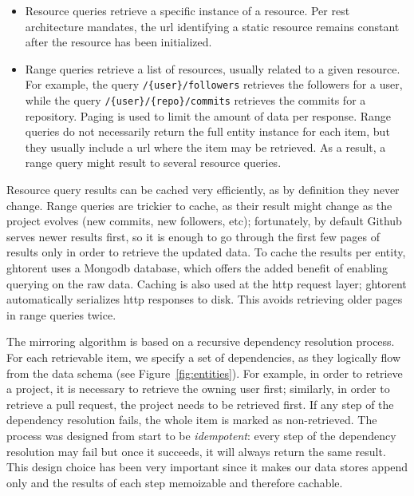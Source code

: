 \documentclass[conference,letter]{IEEEtran}
\begin{document}
\begin{itemize}

  \item Resource queries retrieve a specific instance of a resource. Per 
    {\sc rest} architecture mandates, the {\sc url} identifying a static
    resource remains constant after the resource has been initialized. 

  \item Range queries retrieve a list of resources, usually related to a given
    resource. For example, the query \texttt{/\{user\}/followers} retrieves the
    followers for a user, while the query \texttt{/\{user\}/\{repo\}/commits}
    retrieves the commits for a repository. Paging is used to limit the amount
    of data per response. Range queries do not necessarily return the full
    entity instance for each item, but they usually include a {\sc url} where
    the item may be retrieved. As a result, a range query might result to
    several resource queries.

\end{itemize}

Resource query results can be cached very efficiently, as by definition they
never change. Range queries are trickier to cache, as their result might change
as the project evolves (new commits, new followers, etc); fortunately, by
default Github serves newer results first, so it is enough to go through the
first few pages of results only in order to retrieve the updated data. To cache
the results per entity, {\sc ght}orent uses a Mongo{\sc db} database, which
offers the added benefit of enabling querying on the raw data. Caching is also
used at the {\sc http} request layer; {\sc ght}orent automatically serializes
{\sc http} responses to disk. This avoids retrieving older pages in range
queries twice.

%
The mirroring algorithm is based on a recursive dependency resolution process.
For each retrievable item, we specify a set of dependencies, as they logically
flow from the data schema (see Figure~\ref{fig:entities}). For example, in order
to retrieve a \textsf{project}, it is necessary to retrieve the owning
\textsf{user} first; similarly, in order to retrieve a pull request, the
\textsf{project} needs to be retrieved first. If any step of the dependency
resolution fails, the whole item is marked as non-retrieved.  The process was
designed from start to be \emph{idempotent}: every step of the dependency
resolution may fail but once it succeeds, it will always return the same result.
This design choice has been very important since it makes our data stores append
only and the results of each step memoizable and therefore cachable.
\end{document}
